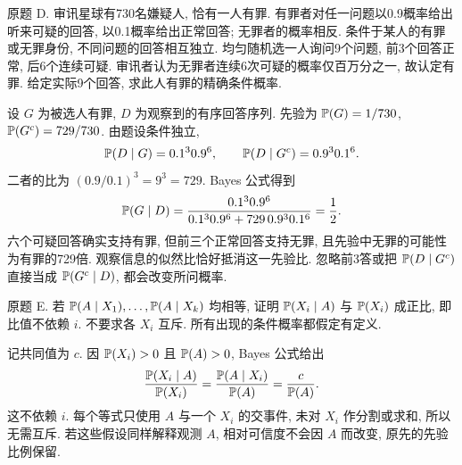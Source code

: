 \begin{exercise}\label{ps3-d}
原题 D. 审讯星球有730名嫌疑人, 恰有一人有罪. 有罪者对任一问题以0.9概率给出听来可疑的回答, 以0.1概率给出正常回答; 无罪者的概率相反. 条件于某人的有罪或无罪身份, 不同问题的回答相互独立. 均匀随机选一人询问9个问题, 前3个回答正常, 后6个连续可疑. 审讯者认为无罪者连续6次可疑的概率仅百万分之一, 故认定有罪. 给定实际9个回答, 求此人有罪的精确条件概率.
\end{exercise}
\begin{solution}
设 $G$ 为被选人有罪, $D$ 为观察到的有序回答序列. 先验为 $\mathbb P(G)=1/730$, $\mathbb P(G^c)=729/730$. 由题设条件独立,
\[
\mathbb P(D\mid G)=0.1^3 0.9^6,\qquad
\mathbb P(D\mid G^c)=0.9^3 0.1^6.
\]
二者的比为 $(0.9/0.1)^3=9^3=729$. Bayes 公式得到
\[
\mathbb P(G\mid D)=\frac{0.1^3 0.9^6}{0.1^3 0.9^6+729\,0.9^3 0.1^6}=\frac12.
\]
六个可疑回答确实支持有罪, 但前三个正常回答支持无罪, 且先验中无罪的可能性为有罪的729倍. 观察信息的似然比恰好抵消这一先验比. 忽略前3答或把 $\mathbb P(D\mid G^c)$ 直接当成 $\mathbb P(G^c\mid D)$, 都会改变所问概率.
\end{solution}

\begin{exercise}\label{ps3-e}
原题 E. 若 $\mathbb P(A\mid X_1),\ldots,\mathbb P(A\mid X_k)$ 均相等, 证明 $\mathbb P(X_i\mid A)$ 与 $\mathbb P(X_i)$ 成正比, 即比值不依赖 $i$. 不要求各 $X_i$ 互斥. 所有出现的条件概率都假定有定义.
\end{exercise}
\begin{solution}
记共同值为 $c$. 因 $\mathbb P(X_i)>0$ 且 $\mathbb P(A)>0$, Bayes 公式给出
\[
\frac{\mathbb P(X_i\mid A)}{\mathbb P(X_i)}
=\frac{\mathbb P(A\mid X_i)}{\mathbb P(A)}=\frac c{\mathbb P(A)}.
\]
这不依赖 $i$. 每个等式只使用 $A$ 与一个 $X_i$ 的交事件, 未对 $X_i$ 作分割或求和, 所以无需互斥. 若这些假设同样解释观测 $A$, 相对可信度不会因 $A$ 而改变, 原先的先验比例保留.
\end{solution}


